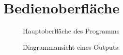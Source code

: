 \section{Bedienoberfläche}

\setlength \fboxsep{0.6cm}
\begin{figure}[h!]
	\centering
	\caption{Hauptoberfläche des Programms}
\end{figure}
\begin{figure}[h!]
	\centering
	\caption{Diagrammansicht eines Outputs}
\end{figure}
